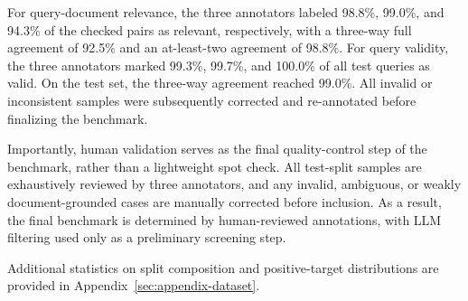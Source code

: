 For query-document relevance, the three annotators labeled 98.8\%, 99.0\%, and 94.3\% of the checked pairs as relevant, respectively, with a three-way full agreement of 92.5\% and an at-least-two agreement of 98.8\%. For query validity, the three annotators marked 99.3\%, 99.7\%, and 100.0\% of all test queries as valid. On the test set, the three-way agreement reached 99.0\%. All invalid or inconsistent samples were subsequently corrected and re-annotated before finalizing the benchmark.

Importantly, human validation serves as the final quality-control step of the benchmark, rather than a lightweight spot check. All test-split samples are exhaustively reviewed by three annotators, and any invalid, ambiguous, or weakly document-grounded cases are manually corrected before inclusion. As a result, the final benchmark is determined by human-reviewed annotations, with LLM filtering used only as a preliminary screening step.

Additional statistics on split composition and positive-target distributions are provided in Appendix~\ref{sec:appendix-dataset}.
\endgroup